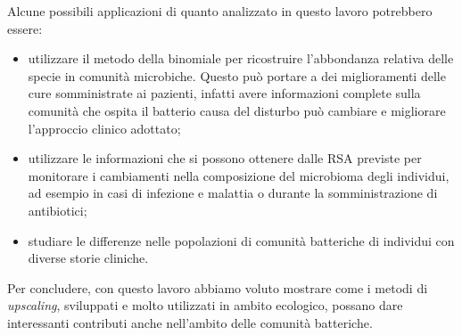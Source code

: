 Alcune possibili applicazioni di quanto analizzato in questo lavoro potrebbero essere:

\begin{itemize}

    \item utilizzare il metodo della binomiale per ricostruire l'abbondanza relativa delle specie in comunità microbiche. Questo può portare a dei miglioramenti delle cure somministrate ai pazienti, infatti avere informazioni complete sulla comunità che ospita il batterio causa del disturbo può cambiare e migliorare l'approccio clinico adottato;
    
    \item utilizzare le informazioni che si possono ottenere dalle RSA previste per monitorare i cambiamenti nella composizione del microbioma degli individui, ad esempio in casi di infezione e malattia o durante la somministrazione di antibiotici;
    
    \item studiare le differenze nelle popolazioni di comunità batteriche di individui con diverse storie cliniche.
    

\end{itemize}


Per concludere, con questo lavoro abbiamo voluto mostrare come i metodi di \emph{upscaling}, sviluppati e molto utilizzati in ambito ecologico, possano dare interessanti contributi anche nell'ambito delle comunità batteriche. 